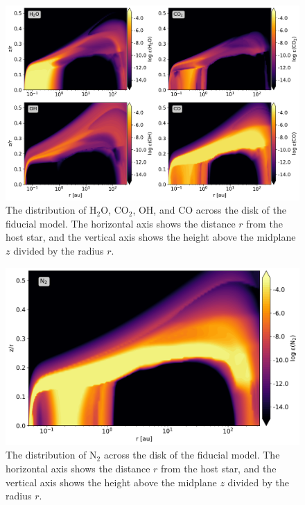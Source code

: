 \documentclass[twoside, single, authoryear, semicolon, 12pt]{lion-msc}
\newcommand{\4}{$_4$}
\newcommand{\3}{$_3$}
\newcommand{\2}{$_2$}
\begin{document}


\begin{figure}[!ht]
    \centering
    \includegraphics[width=\linewidth]{Figures/Abundance1.pdf}
    \caption{The distribution of H\2O, CO\2, OH, and CO across the disk of the fiducial model. The horizontal axis shows the distance $r$ from the host star, and the vertical axis shows the height above the midplane $z$ divided by the radius $r$.}
    \label{fig: others distribution}
\end{figure}

\begin{figure}[!ht]
    \centering
    \includegraphics[width=\linewidth]{Figures/AbundanceN2.pdf}
    \caption{The distribution of N\2 across the disk of the fiducial model. The horizontal axis shows the distance $r$ from the host star, and the vertical axis shows the height above the midplane $z$ divided by the radius $r$.}
    \label{fig: n2 distribution}
\end{figure}
\end{document}
